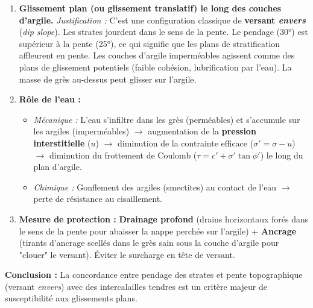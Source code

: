 \documentclass[11pt]{article}
\begin{document}
\begin{exoresolu}
\begin{enumerate}
\begin{popfigure}
        \end{popfigure}
        \item \textbf{Glissement plan (ou glissement translatif) le long des couches d'argile.}
            \textit{Justification :} C'est une configuration classique de \textbf{versant \emph{envers}} (\emph{dip slope}). Les strates jourdent dans le sens de la pente. Le pendage (30°) est supérieur à la pente (25°), ce qui signifie que les plans de stratification affleurent en pente. Les couches d'argile imperméables agissent comme des plans de glissement potentiels (faible cohésion, lubrification par l'eau). La masse de grès au-dessus peut glisser sur l'argile.
        \item \textbf{Rôle de l'eau :}
            \begin{itemize}
                \item \textit{Mécanique :} L'eau s'infiltre dans les grès (perméables) et s'accumule sur les argiles (imperméables) $\rightarrow$ augmentation de la \textbf{pression interstitielle} ($u$) $\rightarrow$ diminution de la contrainte efficace ($\sigma' = \sigma - u$) $\rightarrow$ diminution du frottement de Coulomb ($\tau = c' + \sigma' \tan \phi'$) le long du plan d'argile.
                \item \textit{Chimique :} Gonflement des argiles (smectites) au contact de l'eau $\rightarrow$ perte de résistance au cisaillement.
            \end{itemize}
        \item \textbf{Mesure de protection :} \textbf{Drainage profond} (drains horizontaux forés dans le sens de la pente pour abaisser la nappe perchée sur l'argile) + \textbf{Ancrage} (tirants d'ancrage scellés dans le grès sain sous la couche d'argile pour "clouer" le versant). Éviter le surcharge en tête de versant.
    \end{enumerate}
    \textbf{Conclusion :} La concordance entre pendage des strates et pente topographique (versant \emph{envers}) avec des intercalailles tendres est un critère majeur de susceptibilité aux glissements plans.
\end{exoresolu}
\end{document}
